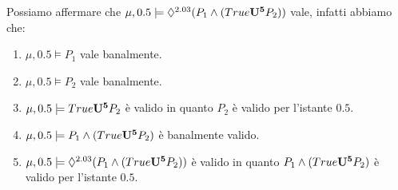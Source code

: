\documentclass[10pt,a4paper]{article}
\begin{document}
	Possiamo affermare che $\mu, 0.5 \models \Diamond^{2.03}(P_1 \land (True \mathbf{U^{5}} P_2))$ vale, infatti abbiamo che:
	\begin{enumerate}
	\item $\mu,0.5\models P_1$ vale banalmente.
	\item $\mu,0.5\models P_2$ vale banalmente.
	\item $\mu,0.5\models True \mathbf{U^{5}} P_2$ è valido in quanto $P_2$ è valido per l'istante $0.5$.
	\item  $\mu,0.5\models P_1 \land (True \mathbf{U^{5}} P_2)$ è banalmente valido.
	\item $\mu, 0.5 \models \Diamond^{2.03}(P_1 \land (True \mathbf{U^{5}} P_2))$ è valido in quanto $P_1 \land (True \mathbf{U^{5}} P_2)$ è valido per l'istante $0.5$.
	
	\end{enumerate}
	
\end{document}
